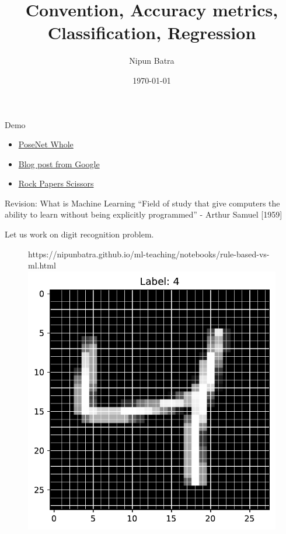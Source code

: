 \documentclass[usenames,dvipsnames]{beamer}
\title{Convention, Accuracy metrics, Classification, Regression}
\date{\today}
\author{Nipun Batra}
\institute{IIT Gandhinagar}
\begin{document}
  \maketitle
  
  \begin{frame}{Demo}
	\begin{itemize}
		\item \href{https://storage.googleapis.com/tfjs-models/demos/posenet/camera.html}{PoseNet Whole}
		\item \href{https://blog.tensorflow.org/2018/05/real-time-human-pose-estimation-in.html}{Blog post from Google}
		\item \href{https://rps-tfjs.netlify.app}{Rock Papers Scissors}
	\end{itemize}
	
	

	
  \end{frame}
  

 
  \begin{frame}{Revision: What is Machine Learning}
	 ``Field of study that give computers the ability to learn
		without being explicitly programmed'' - Arthur Samuel
		[1959]

		\pause Let us work on digit recognition problem.

		\begin{figure}[htp]
			\centering
			\begin{notebookbox}{https://nipunbatra.github.io/ml-teaching/notebooks/rule-based-vs-ml.html}
			  \includegraphics[scale=0.45]{../figures/mnist.pdf}
			\end{notebookbox}
		  \end{figure}
		


	\end{frame}
		
\end{document}
